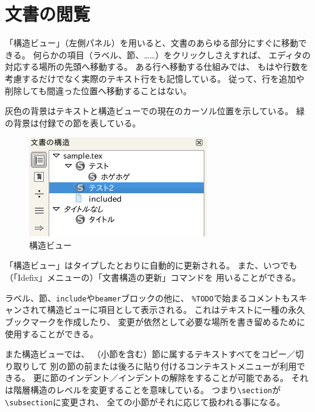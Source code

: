 \section{文書の閲覧}

「構造ビュー」（左側パネル）を用いると、文書のあらゆる部分にすぐに移動できる。
何らかの項目（ラベル、節、……）をクリックしさえすれば、
エディタの対応する場所の先頭へ移動する。
ある行へ移動する仕組みでは、
もはや行数を考慮するだけでなく実際のテキスト行をも記憶している。
従って、行を追加や削除しても間違った位置へ移動することはない。

灰色の背景はテキストと構造ビューでの現在のカーソル位置を示している。
緑の背景は付録での節を表している。

\begin{figure}[H]
  \centering
  \includegraphics{doc5.png}
  \caption{構造ビュー}
\end{figure}

「構造ビュー」はタイプしたとおりに自動的に更新される。
また、いつでも（「Idefix」メニューの）「文書構造の更新」コマンドを
用いることができる。

ラベル、節、\texttt{include}や\texttt{beamer}ブロックの他に、
\verb+%TODO+で始まるコメントもスキャンされて構造ビューに項目として表示される。
これはテキストに一種の永久ブックマークを作成したり、
変更が依然として必要な場所を書き留めるために使用することができる。

また構造ビューでは、
（小節を含む）節に属するテキストすべてをコピー／切り取りして
別の節の前または後ろに貼り付けるコンテキストメニューが利用できる。
更に節のインデント／インデントの解除をすることが可能である。
それは階層構造のレベルを変更することを意味している。
つまり\verb+\section+が\verb+\subsection+に変更され、
全ての小節がそれに応じて扱われる事になる。

